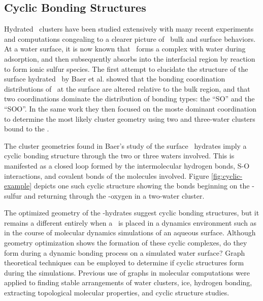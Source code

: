 \subsection {Cyclic Bonding Structures}

Hydrated \suldiox~clusters have been studied extensively with many recent experiments and computations congealing to a clearer picture of \suldiox~bulk and surface behaviors.\cite{Baer2010, Tarbuck2005, Tarbuck2006, Ota2011, Bishenden1998, Hirabayashi2006, Steudel2009, Yang2002, Hayash1985, Moin2011, Eckl2008} At a water surface, it is now known that \suldiox~forms a complex with water during adsorption, and then subsequently absorbs into the interfacial region by reaction to form ionic sulfur species.\cite{Tarbuck2005, Tarbuck2006, Ota2011} The first attempt to elucidate the structure of the surface hydrated \suldiox~by Baer et al. showed that the bonding coordination distributions of \suldiox~at the surface are altered relative to the bulk region, and that two coordinations dominate the distribution of bonding types: the ``SO'' and the ``SOO''. In the same work they then focused on the moste dominant coordination to determine the most likely cluster geometry using two and three-water clusters bound to the \suldiox.

The cluster geometries found in Baer's study of the surface \suldiox~hydrates imply a cyclic bonding structure through the two or three waters involved. This is manifested as a closed loop formed by the intermolecular hydrogen bonds, S-O interactions, and covalent bonds of the molecules involved. Figure \ref{fig:cyclic-example} depicts one such cyclic structure showing the bonds beginning on the \suldiox-sulfur and returning through the \suldiox-oxygen in a two-water cluster.

The optimized geometry of the \suldiox-hydrates suggest cyclic bonding structures, but it remains a different entirely when a \suldiox~is placed in a dynamics environment such as in the course of molecular dynamics simulations of an aqueous surface. Although geometry optimization shows the formation of these cyclic complexes, do they form during a dynamic bonding process on a simulated water surface? Graph theoretical techniques can be employed to determine if cyclic structures form during the simulations. Previous use of graphs in molecular computations were applied to finding stable arrangements of water clusters, ice, hydrogen bonding, extracting topological molecular properties, and cyclic structure studies.\cite{Anick2002, Huber2007, Radhakrishnan1991, Shi2005, Garcia2004, McDonald1998}

